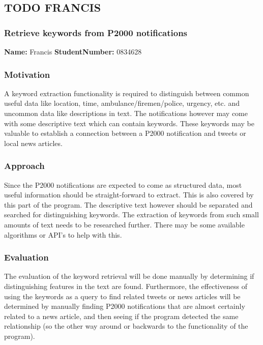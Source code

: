 \subsection{TODO FRANCIS}
\subsubsection*{Retrieve keywords from P2000 notifications}
\textbf{Name:} Francis \indent \textbf{StudentNumber:} 0834628

\subsubsection*{Motivation}
A keyword extraction functionality is required to distinguish between common useful data like location, time, ambulance/firemen/police, urgency, etc. and uncommon data like descriptions in text. The notifications however may come with some descriptive text which can contain keywords. These keywords may be valuable to establish a connection between a P2000 notification and tweets or local news articles. 
 
\subsubsection*{Approach}
Since the P2000 notifications are expected to come as structured data, most useful information should be straight-forward to extract. This is also covered by this part of the program. The descriptive text however should be separated and searched for distinguishing keywords. The extraction of keywords from such small amounts of text needs to be researched further. There may be some available algorithms or API's to help with this. 

\subsubsection*{Evaluation }
The evaluation of the keyword retrieval will be done manually by determining if distinguishing features in the text are found. Furthermore, the effectiveness of using the keywords as a query to find related tweets or news articles will be determined by manually finding P2000 notifications that are almost certainly related to a news article, and then seeing if the program detected the same relationship (so the other way around or backwards to the functionality of the program). 